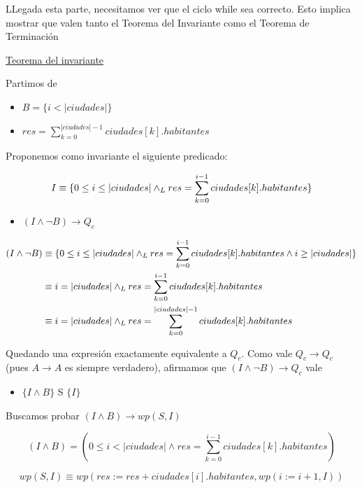 \documentclass[10pt,a4paper]{article}
\begin{document}
\begin {enumerate}
    LLegada esta parte, necesitamos ver que el ciclo while sea correcto. Esto implica mostrar que valen tanto el Teorema del Invariante como el 
    Teorema de Terminación

    \underline{Teorema del invariante}

    Partimos de 

    \begin{itemize}
        \item $B = \{i < |ciudades| \}$
        \item $res =  \sum\limits_{k=0}^{|ciudades| - 1}{ciudades[k].habitantes}$
    \end{itemize}

    Proponemos como invariante el siguiente predicado: 

    $$I \equiv \{0 \leq i \leq |ciudades| \land _L res = \sum\limits_{k=0}^{i - 1}{ciudades[k].habitantes}\}$$

    \begin{itemize}
        \item $(I \land \neg B) \to Q_{c}$
    \end{itemize}

    \begin{align*}
        (I \land \neg B) &\equiv \{0 \leq i \leq |ciudades| \land _L res = \sum\limits_{k=0}^{i - 1}{ciudades[k].habitantes} \land i \geq |ciudades|\} \\
        &\equiv i = |ciudades| \land _L res = \sum\limits_{k=0}^{i - 1}{ciudades[k].habitantes} \\
        &\equiv i = |ciudades| \land _L res = \sum\limits_{k=0}^{|ciudades| - 1}{ciudades[k].habitantes}
    \end{align*}

    Quedando una expresión exactamente equivalente a $Q_{c}$. Como vale $Q_{c} \to Q_{c}$ (pues $A \to A$ es siempre verdadero), afirmamos que $(I \land \neg B) \to Q_{c}$ vale 


    \begin{itemize}
    \item $ \{I \land B\}$ S $\{I\}$
    \end{itemize}

    Buscamos probar $(I \land B) \to wp(S, I)$

    $$ (I \land B) = (0 \leq i < |ciudades| \land res = \sum\limits_{k=0}^{i - 1}{ciudades[k].habitantes})$$

    $$wp(S, I) \equiv wp(res := res + ciudades[i].habitantes, wp(i := i + 1, I))$$


\end{enumerate}
\end{document}
